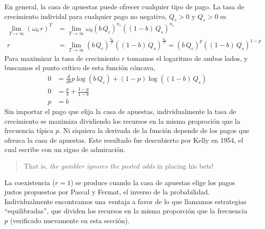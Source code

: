 \documentclass[a4paper,10pt]{book}
\theoremstyle{definition}
\begin{document}

En general, la casa de apuestas puede ofrecer cualquier tipo de pago.
%
La tasa de crecimiento individal para cualquier pago no negativo, $Q_c > 0$ y $Q_s > 0$ es
%
\begin{equation}
\begin{split}
\lim_{T \rightarrow \infty } (\omega_0 \, r)^T &= \lim_{T \rightarrow \infty } \omega_0 (b \, Q_c)^{n_c} ((1-b) \, Q_s )^{n_s} \\
r &= \lim_{T \rightarrow \infty } (b \, Q_c)^{\frac{n_c}{T}} ((1-b) \, Q_s )^{\frac{n_s}{T}} = (b \, Q_c)^{p} ((1-b) \, Q_s )^{1-p}
\end{split}
\end{equation}
%
Para maximizar la tasa de crecimiento $r$ tomamos el logaritmo de ambos lados, y buscamos el punto crítico de esta función cóncava,
%
\begin{equation}
\begin{split}
0 &= \frac{d}{db} p \log (b \, Q_c) + (1-p) \log ((1-b) \, Q_s) \\
0 &= \frac{p}{b} + \frac{1-p}{1-b} \\
p &= b 
\end{split}
\end{equation}
%
Sin importar el pago que elija la casa de apuestas, individualmente la tasa de crecimiento se maximiza dividiendo los recursos en la misma proproción que la frecuencia típica $p$.
%
Ni siquiera la derivada de la función depende de los pagos que ofrezca la casa de apuestas.
%
Este resultado fue descubierto por Kelly en 1954, el cual escribe con un signo de admiración.
%
\begin{quotation}
That is, \emph{the gambler ignores the posted odds} in placing his bets!
\end{quotation}
%
La coexistencia ($r=1$) se produce cuando la casa de apuestas elige los pagos justos propuestos por Pascal y Fermat, el inverso de la probabilidad.
%
Individualmente encontramos una ventaja a favor de lo que llamamos estrategias ``equilibradas'', que dividen los recursos en la misma proporción que la frecuencia $p$ (verificado nuevamente en esta sección).

\end{document}

